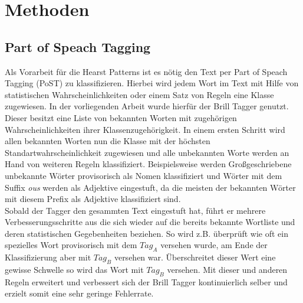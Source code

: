 \section{Methoden}

\subsection{Part of Speach Tagging}%
%
Als Vorarbeit für die Hearst Patterns ist es nötig den Text per Part
of Speach Tagging (PoST) zu klassifizieren. Hierbei wird jedem Wort im
Text mit Hilfe von statistischen Wahrscheinlichkeiten oder einem Satz
von Regeln eine Klasse zugewiesen. In der vorliegenden Arbeit wurde
hierfür der Brill Tagger genutzt.%
\\%
Dieser besitzt eine Liste von bekannten Worten mit zugehörigen
Wahrscheinlichkeiten ihrer Klassenzugehörigkeit. In einem ersten
Schritt wird allen bekannten Worten nun die Klasse mit der höchsten
Standartwahrscheinlichkeit zugewiesen und alle unbekannten Worte
werden an Hand von weiteren Regeln klassifiziert. Beispielsweise
werden Großgeschriebene unbekannte Wörter provisorisch als Nomen
klassifiziert und Wörter mit dem Suffix \textit{ous} werden als
Adjektive eingestuft, da die meisten der bekannten Wörter mit diesem
Prefix als Adjektive klassifiziert sind.%
\\%
Sobald der Tagger den gesammten Text eingestuft hat, führt er mehrere
Verbesserungsschritte aus die sich wieder auf die bereits bekannte
Wortliste und deren statistischen Gegebenheiten beziehen. So wird z.B.
überprüft wie oft ein spezielles Wort provisorisch mit dem $Tag_{A}$
versehen wurde, am Ende der Klassifizierung aber mit $Tag_{B}$
versehen war. Überschreitet dieser Wert eine gewisse Schwelle so wird
das Wort mit $Tag_{B}$ versehen. Mit dieser und anderen Regeln
erweitert und verbessert sich der Brill Tagger kontinuierlich selber
und erzielt somit eine sehr geringe Fehlerrate. \cite{bib:Brill1992}%
%
